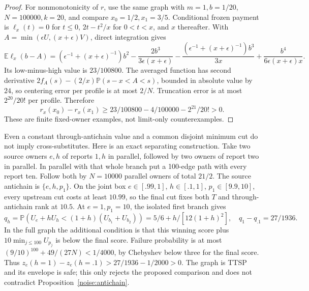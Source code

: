 \documentclass[11pt]{article}
\theoremstyle{definition}\newtheorem{definition}[theorem]{Definition}
\theoremstyle{remark}\newtheorem{remark}[theorem]{Remark}
\newcommand{\E}{\mathbb E}
\newcommand{\Prob}{\mathbb P}
\begin{document}
\begin{proof}
For nonmonotonicity of $r$, use the same graph with $m=1,b=1/20$,
$N=100000,k=20$, and compare $x_0=1/2,x_1=3/5$.
Conditional frozen payment is
$\ell_x(t)=0$ for $t\le0$, $2t-t^2/x$ for $0<t<x$, and $x$ thereafter.
With $A=\min(\epsilon U,(x+\epsilon)V)$, direct integration gives
\[
 \E\ell_x(b-A)=(\epsilon^{-1}+(x+\epsilon)^{-1})b^2
 -\frac{2b^3}{3\epsilon(x+\epsilon)}
 -\frac{(\epsilon^{-1}+(x+\epsilon)^{-1})b^3}{3x}
 +\frac{b^4}{6\epsilon(x+\epsilon)x}.
\]
Its low-minus-high value is $23/100800$. The averaged function has
second derivative $2f_A(s)-(2/x)\Prob(s-x<A<s)$, bounded in absolute value
by $24$, so centering error per profile is at most $2/N$.
Truncation error is at most $2^{20}/20!$ per profile. Therefore
\[
 r_x(x_0)-r_x(x_1)\ge23/100800-4/100000-2^{21}/20!>0.
\]
These are finite fixed-owner examples, not limit-only counterexamples.
\end{proof}

Even a constant through-antichain value and a common disjoint minimum cut
do not imply cross-substitutes. Here is an exact separating construction.
Take two source owners $e,h$ of reports $1,h$ in parallel, followed by two
owners of report two in parallel. In parallel with that whole branch put a
100-edge path with every report ten. Follow both by $N=10000$ parallel
owners of total $21/2$. The source antichain is $\{e,h,p_1\}$.
On the joint box $e\in[.99,1]$, $h\in[.1,1]$, $p_1\in[9.9,10]$,
every upstream cut costs at least $10.99$, so the final cut fixes both
$T$ and through-antichain rank at $10.5$.
At $e=1,p_1=10$, the isolated first branch gives
\[
 q_h=\Prob(U_e+hU_h<(1+h)(U_{b_1}+U_{b_2}))
     =5/6+h/[12(1+h)^2],\quad q_1-q_{.1}=27/1936.
\]
In the full graph the additional condition is that this winning score plus
$10\min_{j\le100}U_{p_j}$ is below the final score. Failure probability
is at most $(9/10)^{100}+49/(27N)<1/4000$, by Chebyshev below three for
the final score. Thus $z_e(h=1)-z_e(h=.1)>27/1936-1/2000>0$.
The graph is TTSP and its envelope is safe; this only rejects the proposed
comparison and does not contradict Proposition~\ref{noise:antichain}.
\end{document}

